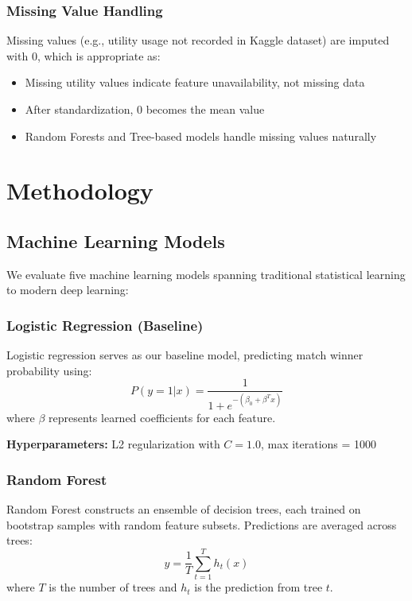 \documentclass[11pt]{article}
\begin{document}
\subsubsection{Missing Value Handling}

Missing values (e.g., utility usage not recorded in Kaggle dataset) are imputed with 0, which is appropriate as:
\begin{itemize}
    \item Missing utility values indicate feature unavailability, not missing data
    \item After standardization, 0 becomes the mean value
    \item Random Forests and Tree-based models handle missing values naturally
\end{itemize}

\section{Methodology}
\label{sec:methodology}

\subsection{Machine Learning Models}

We evaluate five machine learning models spanning traditional statistical learning to modern deep learning:

\subsubsection{Logistic Regression (Baseline)}

Logistic regression serves as our baseline model, predicting match winner probability using:
\begin{equation}
P(y = 1|x) = \frac{1}{1 + e^{-(\beta_0 + \beta^T x)}}
\end{equation}
where $\beta$ represents learned coefficients for each feature.

\textbf{Hyperparameters:} L2 regularization with $C = 1.0$, max iterations = 1000

\subsubsection{Random Forest}

Random Forest constructs an ensemble of decision trees, each trained on bootstrap samples with random feature subsets. Predictions are averaged across trees:
\begin{equation}
\hat{y} = \frac{1}{T} \sum_{t=1}^{T} h_t(x)
\end{equation}
where $T$ is the number of trees and $h_t$ is the prediction from tree $t$.
\end{document}
